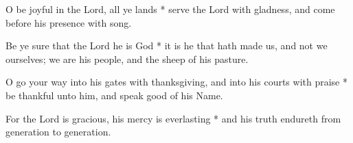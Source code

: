 O be joyful in the Lord, all ye lands * serve the Lord with gladness, and come before his presence with song.

Be ye sure that the Lord he is God * it is he that hath made us, and not we ourselves; we are his people, and the sheep of his pasture.

O go your way into his gates with thanksgiving, and into his courts with praise * be thankful unto him, and speak good of his Name.

For the Lord is gracious, his mercy is everlasting * and his truth endureth from generation to generation.